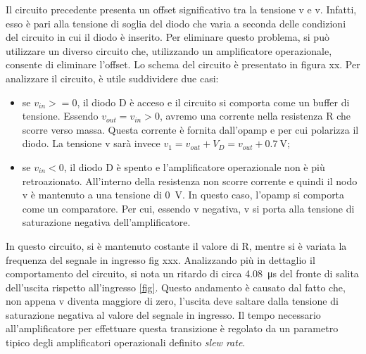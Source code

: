 Il circuito precedente presenta un offset significativo tra la tensione v e v. Infatti, esso è pari alla tensione di soglia del diodo che varia a seconda delle condizioni del circuito in cui il diodo è inserito. Per eliminare questo problema, si può utilizzare un diverso circuito che, utilizzando un amplificatore operazionale, consente di eliminare l'offset. Lo schema del circuito è presentato in figura xx.
Per analizzare il circuito, è utile suddividere due casi:
\begin{itemize}
	\item se $v_{in}>=0$, il diodo D è acceso e il circuito si comporta come un buffer di tensione. Essendo $v_{out}=v_{in}>0$, avremo una corrente nella resistenza R che scorre verso massa. Questa corrente è fornita dall'opamp e per cui polarizza il diodo. La tensione v sarà invece $v_1=v_{out}+V_D=v_{out}+\SI{0.7}{\volt}$;
	\item se $v_{in}<0$, il diodo D è spento e l'amplificatore operazionale non è più retroazionato. All'interno della resistenza non scorre corrente e quindi il nodo v è mantenuto a una tensione di \SI{0}{\volt}. In questo caso, l'opamp si comporta come un comparatore. Per cui, essendo v negativa, v si porta alla tensione di saturazione negativa dell'amplificatore.
\end{itemize}
In questo circuito, si è mantenuto costante il valore di R, mentre si è variata la frequenza del segnale in ingresso fig xxx.
Analizzando più in dettaglio il comportamento del circuito, si nota un ritardo di circa \SI{4.08}{\micro\second} del fronte di salita dell'uscita rispetto all'ingresso \ref{fig}. Questo andamento è causato dal fatto che, non appena v diventa maggiore di zero, l'uscita deve saltare dalla tensione di saturazione negativa al valore del segnale in ingresso. Il tempo necessario all'amplificatore per effettuare questa transizione è regolato da un parametro tipico degli amplificatori operazionali definito \textit{slew rate}. 
